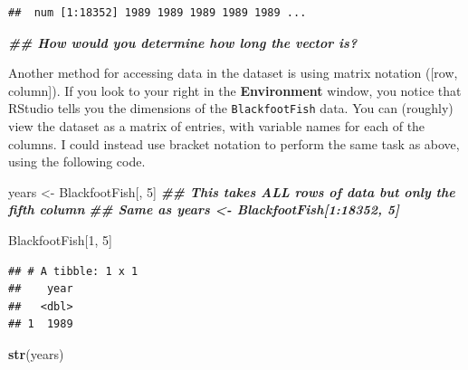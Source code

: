 \documentclass[
  10pt,
  letterpaper,
  twoside,
  openright]{book}
\newenvironment{Shaded}{\begin{snugshade}}{\end{snugshade}}
\newcommand{\DecValTok}[1]{\textcolor[rgb]{0.00,0.00,0.81}{#1}}
\newcommand{\DocumentationTok}[1]{\textcolor[rgb]{0.56,0.35,0.01}{\textbf{\textit{#1}}}}
\newcommand{\FunctionTok}[1]{\textcolor[rgb]{0.13,0.29,0.53}{\textbf{#1}}}
\newcommand{\NormalTok}[1]{#1}
\newcommand{\OtherTok}[1]{\textcolor[rgb]{0.56,0.35,0.01}{#1}}
\newcommand{\SpecialCharTok}[1]{\textcolor[rgb]{0.81,0.36,0.00}{\textbf{#1}}}
\begin{document}
\begin{Shaded}
\end{Shaded}

\begin{verbatim}
##  num [1:18352] 1989 1989 1989 1989 1989 ...
\end{verbatim}

\begin{Shaded}
\begin{Highlighting}[]
\DocumentationTok{\#\# How would you determine how long the vector is?}
\end{Highlighting}
\end{Shaded}

Another method for accessing data in the dataset is using matrix
notation ({[}row, column{]}). If you look to your right in the
\textbf{Environment} window, you notice that RStudio tells you the
dimensions of the \texttt{BlackfootFish} data. You can (roughly) view
the dataset as a matrix of entries, with variable names for each of the
columns. I could instead use bracket notation to perform the same task
as above, using the following code.

\begin{Shaded}
\begin{Highlighting}[]
\NormalTok{years }\OtherTok{\textless{}{-}}\NormalTok{ BlackfootFish[, }\DecValTok{5}\NormalTok{] }
\DocumentationTok{\#\# This takes ALL rows of data but only the fifth column  }
\DocumentationTok{\#\# Same as years \textless{}{-} BlackfootFish[1:18352, 5]}

\NormalTok{BlackfootFish[}\DecValTok{1}\NormalTok{, }\DecValTok{5}\NormalTok{]}
\end{Highlighting}
\end{Shaded}

\begin{verbatim}
## # A tibble: 1 x 1
##    year
##   <dbl>
## 1  1989
\end{verbatim}

\begin{Shaded}
\begin{Highlighting}[]
\FunctionTok{str}\NormalTok{(years)}
\end{Highlighting}
\end{Shaded}
\end{document}
